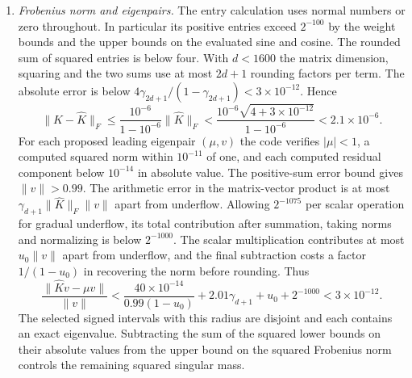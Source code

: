 \begin{enumerate}
Let $p$ be the product of the two exact weights, $\widehat p$ their
rounded counterpart, and $h$ the proposed square root of $\widehat p$.
The rounded weights lie between $2^{-10}$ and $2^{83}$. The rounded
square and division in the root check produce a quotient within
$10^{-14}$ of one. The final subtraction of one is exact by Sterbenz's
lemma. The check forces the rounded square and quotient into the normal
range, so allowing for those two roundings gives
\[
 \left|\frac{h^2}{\widehat p}-1\right|
 \le(1+10^{-14})(1+\gamma_2)-1<1.1\times10^{-14}.
\]
The weight enclosures then put $h^2/p$ between
$(1-\epsilon_w)^2(1-u_0)(1-1.1\times10^{-14})$ and
$(1+\epsilon_w)^2(1+u_0)(1+1.1\times10^{-14})$. These endpoints lie
strictly between $(1-3\times10^{-7})^2$ and $(1+3\times10^{-7})^2$.
The two reciprocal terms are positive, so their sum has the same
relative error bound before rounding. Including the addition, denominator
rounding, division and final multiplication gives
\[
 \left|\frac{\widehat K_{ij}}{K_{ij}}-1\right|
 \le (1+2\times10^{-12})(1+3\times10^{-7})(1+\gamma_4)-1
 <10^{-6}.
\]

\item \emph{Frobenius norm and eigenpairs.} The entry calculation uses
normal numbers or zero throughout. In particular its positive entries
exceed $2^{-100}$ by the weight bounds and the upper bounds on the
evaluated sine and cosine. The rounded sum of squared entries is below
four. With $d<1600$ the matrix dimension, squaring and the two sums
use at most $2d+1$ rounding factors per term. The absolute error is below
$4\gamma_{2d+1}/(1-\gamma_{2d+1})<3\times10^{-12}$. Hence
\[
 \|K-\widehat K\|_F
 \le \frac{10^{-6}}{1-10^{-6}}\|\widehat K\|_F
 < \frac{10^{-6}\sqrt{4+3\times10^{-12}}}{1-10^{-6}}
 <2.1\times10^{-6}.
\]
For each proposed leading eigenpair $(\mu,v)$ the code verifies
$|\mu|<1$, a computed squared norm within $10^{-11}$ of one, and
each computed residual component below $10^{-14}$ in absolute value.
The positive-sum error bound gives $\|v\|>0.99$. The arithmetic error in
the matrix-vector product is at most $\gamma_{d+1}\|\widehat K\|_F\|v\|$
apart from underflow. Allowing $2^{-1075}$ per scalar operation for gradual
underflow, its total contribution after summation, taking norms and
normalizing is below $2^{-1000}$. The scalar multiplication contributes
at most $u_0\|v\|$ apart from underflow, and the final subtraction costs
a factor $1/(1-u_0)$ in recovering the norm before rounding. Thus
\[
 \frac{\|\widehat K v-\mu v\|}{\|v\|}
 < \frac{40\times10^{-14}}{0.99(1-u_0)}
    +2.01\gamma_{d+1}+u_0+2^{-1000}<3\times10^{-12}.
\]
The selected signed intervals with this radius are disjoint and each
contains an exact eigenvalue. Subtracting the sum of the squared lower
bounds on their absolute values from the upper bound on the squared
Frobenius norm controls the remaining squared singular mass.
\end{enumerate}

